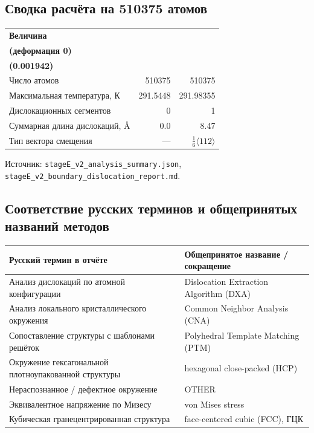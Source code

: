 \documentclass[12pt,a4paper]{extarticle}
\newcommand{\code}[1]{\texttt{#1}}
\newcommand{\hh}[1]{\small\textbf{#1}}
\begin{document}
\subsection{Сводка расчёта на 510375 атомов}
\begin{center}
\small
\setlength{\tabcolsep}{6pt}
\renewcommand{\arraystretch}{1.2}
\begin{tabular}{p{60mm} r r}
\toprule
\hh{Величина} & \shortstack[r]{\hh{Контрольный}\\\hh{(деформация 0)}} & \shortstack[r]{\hh{Физический}\\\hh{(0.001942)}} \\
\midrule
Число атомов & 510375 & 510375 \\
Максимальная температура, К & 291.5448 & 291.98355 \\
Дислокационных сегментов & 0 & 1 \\
Суммарная длина дислокаций, Å & 0.0 & 8.47 \\
Тип вектора смещения & --- & $\tfrac{1}{6}\langle 112\rangle$ \\
\bottomrule
\end{tabular}
\end{center}
\noindent\footnotesize Источник: \code{stageE\_v2\_analysis\_summary.json}, \code{stageE\_v2\_boundary\_dislocation\_report.md}.\normalsize

\subsection{Соответствие русских терминов и общепринятых названий методов}
\begin{center}
\small
\setlength{\tabcolsep}{6pt}
\renewcommand{\arraystretch}{1.2}
\begin{tabular}{p{82mm} p{72mm}}
\toprule
\hh{Русский термин в отчёте} & \hh{Общепринятое название / сокращение} \\
\midrule
Анализ дислокаций по атомной конфигурации & Dislocation Extraction Algorithm (DXA) \\
Анализ локального кристаллического окружения & Common Neighbor Analysis (CNA) \\
Сопоставление структуры с шаблонами решёток & Polyhedral Template Matching (PTM) \\
Окружение гексагональной плотноупакованной структуры & hexagonal close-packed (HCP) \\
Нераспознанное / дефектное окружение & OTHER \\
Эквивалентное напряжение по Мизесу & von Mises stress \\
Кубическая гранецентрированная структура & face-centered cubic (FCC), ГЦК \\
\bottomrule
\end{tabular}
\end{center}
\end{document}
